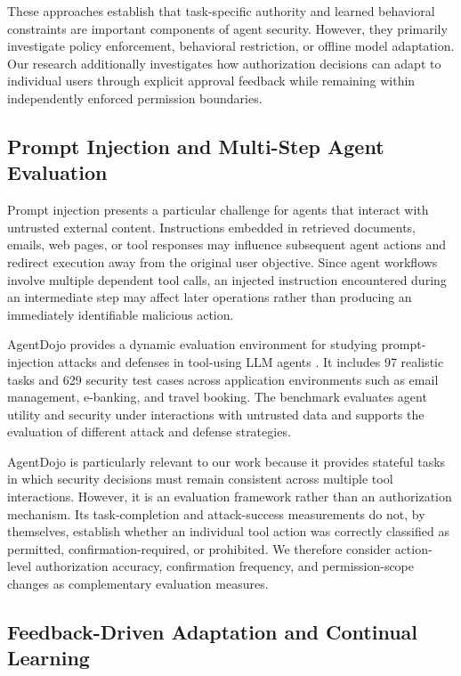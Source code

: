 \documentclass[10pt,conference]{IEEEtran}
\begin{document}
These approaches establish that task-specific authority and learned behavioral constraints are important components of agent security. However, they primarily investigate policy enforcement, behavioral restriction, or offline model adaptation. Our research additionally investigates how authorization decisions can adapt to individual users through explicit approval feedback while remaining within independently enforced permission boundaries.

\subsection{Prompt Injection and Multi-Step Agent Evaluation}

Prompt injection presents a particular challenge for agents that interact with untrusted external content. Instructions embedded in retrieved documents, emails, web pages, or tool responses may influence subsequent agent actions and redirect execution away from the original user objective. Since agent workflows involve multiple dependent tool calls, an injected instruction encountered during an intermediate step may affect later operations rather than producing an immediately identifiable malicious action.

AgentDojo provides a dynamic evaluation environment for studying prompt-injection attacks and defenses in tool-using LLM agents \cite{debenedetti2024agentdojo}. It includes 97 realistic tasks and 629 security test cases across application environments such as email management, e-banking, and travel booking. The benchmark evaluates agent utility and security under interactions with untrusted data and supports the evaluation of different attack and defense strategies.

AgentDojo is particularly relevant to our work because it provides stateful tasks in which security decisions must remain consistent across multiple tool interactions. However, it is an evaluation framework rather than an authorization mechanism. Its task-completion and attack-success measurements do not, by themselves, establish whether an individual tool action was correctly classified as permitted, confirmation-required, or prohibited. We therefore consider action-level authorization accuracy, confirmation frequency, and permission-scope changes as complementary evaluation measures.

\subsection{Feedback-Driven Adaptation and Continual Learning}
\end{document}

